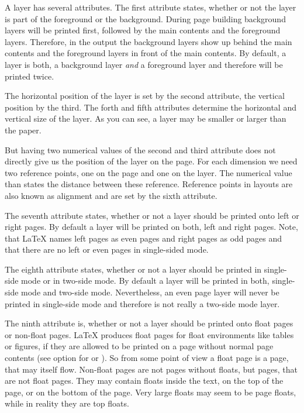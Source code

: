 A layer has several attributes. The first attribute states, whether or not the
layer is part of the foreground or the background. During page building
background layers will be printed first, followed by the main contents and the
foreground layers. Therefore, in the output the background layers show up
behind the main contents and the foreground layers in front of the main
contents. By default, a layer is both, a background layer \emph{and} a
foreground layer and therefore will be printed twice.

The horizontal position of the layer is set by the second attribute, the
vertical position by the third. The forth and fifth attributes determine the
horizontal and vertical size of the layer. As you can see, a layer may be
smaller or larger than the paper.

But having two numerical values of the second and third attribute does not
directly give us the position of the layer on the page. For each dimension we
need two reference points, one on the page and one on the layer. The
numerical value than states the distance between these reference.
Reference points in layouts are also known as alignment and are set by the
sixth attribute.

The seventh attribute states, whether or not a layer should be
printed onto left or right pages. By default a layer will be printed on both,
left and right pages. Note, that \LaTeX{} names left pages as even pages and
right pages as odd pages and that there are no left or even pages in
single-sided mode.

The eighth attribute states, whether or not a layer should be printed in
single-side mode or in two-side mode. By default a layer will be printed in
both, single-side mode and two-side mode. Nevertheless, an even page layer will
never be printed in single-side mode and therefore is not really a two-side
mode layer.

The ninth attribute is, whether or not a layer should be printed onto float
pages or non-float pages. \LaTeX{} produces float pages for float environments
like tables or figures, if they are allowed to be printed on a page without
normal page contents (see option  for  or
). So from some point of view a float page is a page, that
may itself flow. Non-float pages are not pages without floats, but pages, that
are not float pages. They may contain floats inside the text, on the top of
the page, or on the bottom of the page. Very large floats may seem to be page
floats, while in reality they are top floats.

